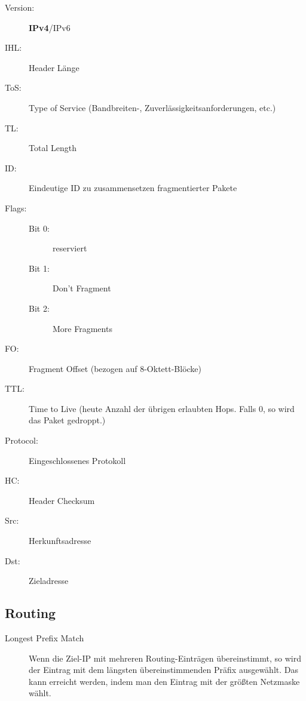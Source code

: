 \documentclass[a4paper]{article}
\begin{document}
\vspace{5mm}
\begin{minipage}{0.45\textwidth}
    \begin{description}
        \item[Version:] \textbf{IPv4}/IPv6
        \item[IHL:] Header Länge
        \item[ToS:] Type of Service (Bandbreiten-, Zuverlässigkeitsanforderungen, etc.)
        \item[TL:] Total Length
        \item[ID:] Eindeutige ID zu zusammensetzen fragmentierter Pakete
        \item[Flags:]\hfill
        \begin{description}
            \item[Bit 0:] reserviert
            \item[Bit 1:] Don't Fragment
            \item[Bit 2:] More Fragments
        \end{description}
    \end{description}
\end{minipage}
\begin{minipage}{0.1\textwidth}
\end{minipage}
\begin{minipage}{0.45\textwidth}
    \begin{description}
        \item[FO:] Fragment Offset (bezogen auf 8-Oktett-Blöcke)
        \item[TTL:] Time to Live (heute Anzahl der übrigen erlaubten Hops. Falls 0, so wird das Paket gedroppt.)
        \item[Protocol:] Eingeschlossenes Protokoll
        \item[HC:] Header Checksum
        \item[Src:] Herkunftsadresse
        \item[Dst:] Zieladresse
    \end{description}
\end{minipage}

\subsection{Routing}
\begin{description}
    \item[Longest Prefix Match] Wenn die Ziel-IP mit mehreren Routing-Einträgen übereinstimmt, so wird der Eintrag mit dem längsten übereinstimmenden Präfix ausgewählt. Das kann erreicht werden, indem man den Eintrag mit der größten Netzmaske wählt.
\end{description}
\end{document}
